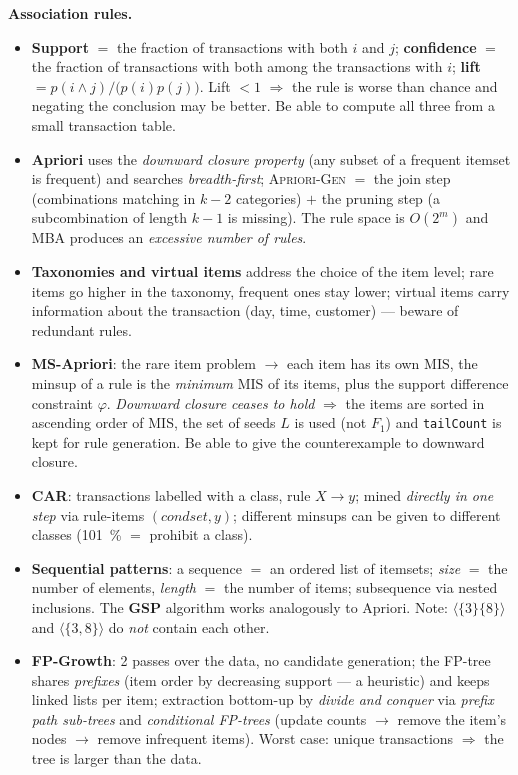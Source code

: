 \documentclass[11pt,a4paper]{article}
\theoremstyle{definition}
\begin{document}
\textbf{Association rules.}
\begin{itemize}
\item \textbf{Support} $=$ the fraction of transactions with both $i$ and $j$; \textbf{confidence}
      $=$ the fraction of transactions with both among the transactions with $i$; \textbf{lift}
      $=p(i\wedge j)/\big(p(i)p(j)\big)$. Lift $<1$ $\Rightarrow$ the rule is worse than chance and
      negating the conclusion may be better. Be able to compute all three from a small transaction
      table.
\item \textbf{Apriori} uses the \emph{downward closure property} (any subset of a frequent itemset
      is frequent) and searches \emph{breadth-first}; \textsc{Apriori-Gen} $=$ the join step
      (combinations matching in $k-2$ categories) $+$ the pruning step (a subcombination of length
      $k-1$ is missing). The rule space is $O(2^m)$ and MBA produces an \emph{excessive number of
      rules}.
\item \textbf{Taxonomies and virtual items} address the choice of the item level; rare items go
      higher in the taxonomy, frequent ones stay lower; virtual items carry information about the
      transaction (day, time, customer) --- beware of redundant rules.
\item \textbf{MS-Apriori}: the rare item problem $\to$ each item has its own $\mathrm{MIS}$, the
      minsup of a rule is the \emph{minimum} MIS of its items, plus the support difference
      constraint $\varphi$. \emph{Downward closure ceases to hold} $\Rightarrow$ the items are
      sorted in ascending order of MIS, the set of seeds $L$ is used (not $F_1$) and
      \texttt{tailCount} is kept for rule generation. Be able to give the counterexample to
      downward closure.
\item \textbf{CAR}: transactions labelled with a class, rule $X\to y$; mined \emph{directly in one
      step} via rule-items $(\mathit{condset},y)$; different minsups can be given to different
      classes (101~\% $=$ prohibit a class).
\item \textbf{Sequential patterns}: a sequence $=$ an ordered list of itemsets; \emph{size} $=$ the
      number of elements, \emph{length} $=$ the number of items; subsequence via nested inclusions.
      The \textbf{GSP} algorithm works analogously to Apriori. Note:
      $\langle\{3\}\{8\}\rangle$ and $\langle\{3,8\}\rangle$ do \emph{not} contain each other.
\item \textbf{FP-Growth}: 2 passes over the data, no candidate generation; the FP-tree shares
      \emph{prefixes} (item order by decreasing support --- a heuristic) and keeps linked lists per
      item; extraction bottom-up by \emph{divide and conquer} via \emph{prefix path sub-trees} and
      \emph{conditional FP-trees} (update counts $\to$ remove the item's nodes $\to$ remove
      infrequent items). Worst case: unique transactions $\Rightarrow$ the tree is larger than the
      data.
\end{itemize}
\end{document}
